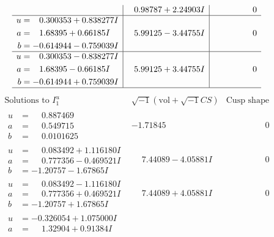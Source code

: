 \documentclass[1p]{elsarticle_modified}
\theoremstyle{definition}
\newcommand{\I}{\sqrt{-1}}
\begin{document}
$$\begin{array}{c|c|c}
 & \phantom{-}0.98787 + 2.24903 I & \phantom{-0.000000 } 0 \\ \hline\begin{aligned}
u &= \phantom{-}0.300353 + 0.838277 I \\
a &= \phantom{-}1.68395 + 0.66185 I \\
b &= -0.614944 - 0.759039 I\end{aligned}
 & \phantom{-}5.99125 - 3.44755 I & \phantom{-0.000000 } 0 \\ \hline\begin{aligned}
u &= \phantom{-}0.300353 - 0.838277 I \\
a &= \phantom{-}1.68395 - 0.66185 I \\
b &= -0.614944 + 0.759039 I\end{aligned}
 & \phantom{-}5.99125 + 3.44755 I & \phantom{-0.000000 } 0\\
 \hline 
 \end{array}$$\newpage$$\begin{array}{c|c|c}  
\text{Solutions to }I^u_{1}& \I (\text{vol} + \sqrt{-1}CS) & \text{Cusp shape}\\
 \hline 
\begin{aligned}
u &= \phantom{-}0.887469\phantom{ +0.000000I} \\
a &= \phantom{-}0.549715\phantom{ +0.000000I} \\
b &= \phantom{-}0.0101625\phantom{ +0.000000I}\end{aligned}
 & -1.71845\phantom{ +0.000000I} & \phantom{-0.000000 } 0 \\ \hline\begin{aligned}
u &= \phantom{-}0.083492 + 1.116180 I \\
a &= \phantom{-}0.777356 - 0.469521 I \\
b &= -1.20757 - 1.67865 I\end{aligned}
 & \phantom{-}7.44089 - 4.05881 I & \phantom{-0.000000 } 0 \\ \hline\begin{aligned}
u &= \phantom{-}0.083492 - 1.116180 I \\
a &= \phantom{-}0.777356 + 0.469521 I \\
b &= -1.20757 + 1.67865 I\end{aligned}
 & \phantom{-}7.44089 + 4.05881 I & \phantom{-0.000000 } 0 \\ \hline\begin{aligned}
u &= -0.326054 + 1.075000 I \\
a &= \phantom{-}1.32904 + 0.91384 I \\

\end{aligned}
\end{array}$$
\end{document}
